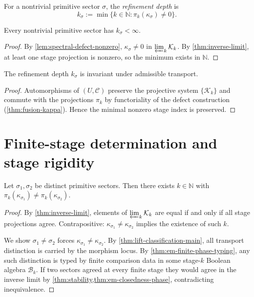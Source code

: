 \begin{definition}
\label{def:spectral-depth}
For a nontrivial primitive sector $\sigma$, the
\emph{refinement depth} is
\[
  k_\sigma
  := \min\bigl\{ k \in \mathbb N : \pi_k(\kappa_\sigma) \neq 0 \bigr\}.
\]
\end{definition}

\begin{proposition}
\label{prop:spectral-depth-finite}
Every nontrivial primitive sector has $k_\sigma < \infty$.
\end{proposition}

\begin{proof}
By \cref{lem:spectral-defect-nonzero}, $\kappa_\sigma \neq 0$ in
$\varprojlim_k \mathcal K_k$.
By \cref{thm:inverse-limit}, at least one stage projection is nonzero,
so the minimum exists in $\mathbb N$.
\end{proof}

\begin{proposition}
\label{prop:spectral-depth-invariant}
The refinement depth $k_\sigma$ is invariant under admissible transport.
\end{proposition}

\begin{proof}
Automorphisms of $(U,\mathcal C)$ preserve the projective system
$\{\mathcal K_k\}$ and commute with the projections $\pi_k$ by
functoriality of the defect construction (\cref{thm:fusion-kappa}).
Hence the minimal nonzero stage index is preserved.
\end{proof}

\section{Finite-stage determination and stage rigidity}
\label{sec:spectral-rigidity}

\begin{lemma}
\label{lem:spectral-finite-sep}
Let $\sigma_1, \sigma_2$ be distinct primitive sectors.
Then there exists $k \in \mathbb N$ with
$\pi_k(\kappa_{\sigma_1}) \neq \pi_k(\kappa_{\sigma_2})$.
\end{lemma}

\begin{proof}
By \cref{thm:inverse-limit}, elements of $\varprojlim_k \mathcal K_k$
are equal if and only if all stage projections agree.
Contrapositive: $\kappa_{\sigma_1} \neq \kappa_{\sigma_2}$ implies the
existence of such $k$.

We show $\sigma_1 \neq \sigma_2$ forces $\kappa_{\sigma_1} \neq
\kappa_{\sigma_2}$.
By \cref{thm:lift-classification-main}, all transport distinction is
carried by the morphism locus.
By \cref{thm:em-finite-phase-typing}, any such distinction is typed by
finite comparison data in some stage-$k$ Boolean algebra $\mathcal B_k$.
If two sectors agreed at every finite stage they would agree in the
inverse limit by \cref{thm:stability,thm:em-closedness-phase},
contradicting inequivalence.
\end{proof}

